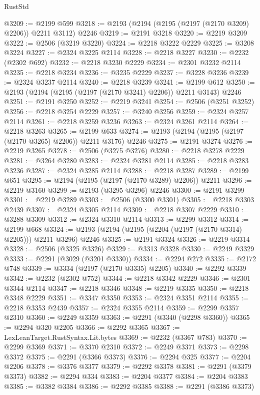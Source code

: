 \begin{lexlean}{RustStd}
\begin{coremodule}
@3209 := @2199 @599
@3218 := @2193 (@2194 (@2195 (@2197 (@2170 @3209) @2206)) @2211 @3112) @2246
@3219 := @2191 @3218
@3220 := @2219 @3209
@3222 := @2506 (@3219 @3220)
@3224 := @2218 @3222 @2229
@3225 := @3208 @3224
@3227 := @2324 @3225 @2114
@3228 := @2218 @3227
@3230 := @2232 (@2302 @692)
@3232 := @2218 @3230 @2229
@3234 := @2301 @3232 @2114
@3235 := @2218 @3234
@3236 := @3235 @2229
@3237 := @3228 @3236
@3239 := @2324 @3237 @2114
@3240 := @2218 @3239
@3241 := @2199 @612
@3250 := @2193 (@2194 (@2195 (@2197 (@2170 @3241) @2206)) @2211 @3143) @2246
@3251 := @2191 @3250
@3252 := @2219 @3241
@3254 := @2506 (@3251 @3252)
@3256 := @2218 @3254 @2229
@3257 := @3240 @3256
@3259 := @2324 @3257 @2114
@3261 := @2218 @3259 @3236
@3263 := @2324 @3261 @2114
@3264 := @2218 @3263
@3265 := @2199 @633
@3274 := @2193 (@2194 (@2195 (@2197 (@2170 @3265) @2206)) @2211 @3176) @2246
@3275 := @2191 @3274
@3276 := @2219 @3265
@3278 := @2506 (@3275 @3276)
@3280 := @2218 @3278 @2229
@3281 := @3264 @3280
@3283 := @2324 @3281 @2114
@3285 := @2218 @3283 @3236
@3287 := @2324 @3285 @2114
@3288 := @2218 @3287
@3289 := @2199 @651
@3295 := @2194 (@2195 (@2197 (@2170 @3289) @2206)) @2211
@3296 := @2219 @3160
@3299 := @2193 (@3295 @3296) @2246
@3300 := @2191 @3299
@3301 := @2219 @3289
@3303 := @2506 (@3300 @3301)
@3305 := @2218 @3303 @2439
@3307 := @2324 @3305 @2114
@3309 := @2218 @3307 @2229
@3310 := @3288 @3309
@3312 := @2324 @3310 @2114
@3313 := @2299 @3312
@3314 := @2199 @668
@3324 := @2193 (@2194 (@2195 (@2204 (@2197 (@2170 @3314) @2205))) @2211 @3296) @2246
@3325 := @2191 @3324
@3326 := @2219 @3314
@3328 := @2506 (@3325 @3326)
@3329 := @3313 @3328
@3330 := @2249 @3329
@3333 := @2291 (@3029 (@3201 @3330))
@3334 := @2294 @272
@3335 := @2172 @748
@3339 := @3334 (@2197 (@2170 @3335) @2205)
@3340 := @2292 @3339
@3342 := @2232 (@2302 @752)
@3344 := @2218 @3342 @2229
@3346 := @2301 @3344 @2114
@3347 := @2218 @3346
@3348 := @2219 @3335
@3350 := @2218 @3348 @2229
@3351 := @3347 @3350
@3353 := @2324 @3351 @2114
@3355 := @2218 @3353 @2439
@3357 := @2324 @3355 @2114
@3359 := @2299 @3357 @2310
@3360 := @2249 @3359
@3363 := @2291 (@3340 (@2298 @3360))
@3365 := @2294 @320 @2205
@3366 := @2292 @3365
@3367 := LexLeanTarget.RustSyntax.Lit.bytes
@3369 := @2232 (@3367 @783)
@3370 := @2299 @3369
@3371 := @3370 @2310
@3372 := @2249 @3371
@3373 := @2298 @3372
@3375 := @2291 (@3366 @3373)
@3376 := @2294 @325
@3377 := @2204 @2206
@3378 := @3376 @3377
@3379 := @2292 @3378
@3381 := @2291 (@3379 @3373)
@3382 := @2294 @334
@3383 := @2204 @3377
@3384 := @2204 @3383
@3385 := @3382 @3384
@3386 := @2292 @3385
@3388 := @2291 (@3386 @3373)

\end{coremodule}
\end{lexlean}

